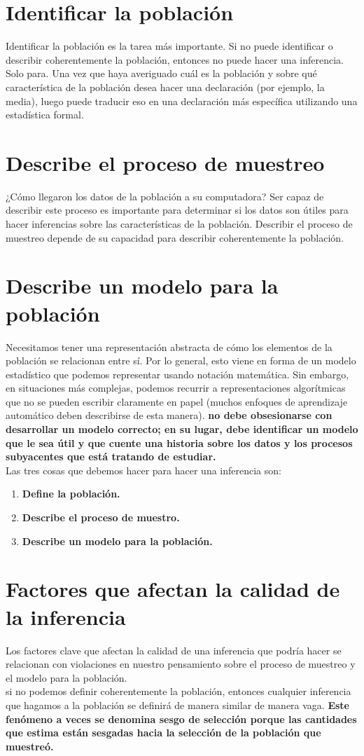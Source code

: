 \documentclass[10pt]{book}
\begin{document}
    \section{Identificar la población}
    Identificar la población es la tarea más importante. Si no puede identificar o describir coherentemente la población, entonces no puede hacer una inferencia. Solo para. Una vez que haya averiguado cuál es la población y sobre qué característica de la población desea hacer una declaración (por ejemplo, la media), luego puede traducir eso en una declaración más específica utilizando una estadística formal.\\ 
    \section{Describe el proceso de muestreo}
    ¿Cómo llegaron los datos de la población a su computadora? Ser capaz de describir este proceso es importante para determinar si los datos son útiles para hacer inferencias sobre las características de la población. Describir el proceso de muestreo depende de su capacidad para describir coherentemente la población.
    \section{Describe un modelo para la población}
    Necesitamos tener una representación abstracta de cómo los elementos de la población se relacionan entre sí. Por lo general, esto viene en forma de un modelo estadístico que podemos representar usando notación matemática. Sin embargo, en situaciones más complejas, podemos recurrir a representaciones algorítmicas que no se pueden escribir claramente en papel (muchos enfoques de aprendizaje automático deben describirse de esta manera).
    \textbf{no debe obsesionarse con desarrollar un modelo correcto; en su lugar, debe identificar un modelo que le sea útil y que cuente una historia sobre los datos y los procesos subyacentes que está tratando de estudiar.}\\
    Las tres cosas que debemos hacer para hacer una inferencia son:
    \begin{enumerate}[\bfseries 1.]
	\item \textbf{Define la población.} 
	\item \textbf{Describe el proceso de muestro.}
	\item \textbf{Describe un modelo para la población.}
    \end{enumerate}
    \section{Factores que afectan la calidad de la inferencia}
    Los factores clave que afectan la calidad de una inferencia que podría hacer se relacionan con violaciones en nuestro pensamiento sobre el proceso de muestreo y el modelo para la población.\\
    si no podemos definir coherentemente la población, entonces cualquier inferencia que hagamos a la población se definirá de manera similar de manera vaga.
    \textbf{Este fenómeno a veces se denomina sesgo de selección porque las cantidades que estima están sesgadas hacia la selección de la población que muestreó.}
\end{document}
